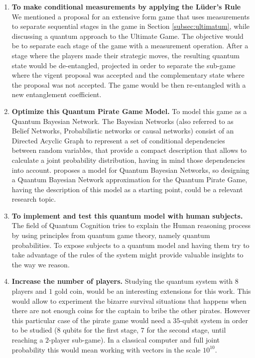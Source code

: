 \begin{enumerate}

\item \textbf{To make conditional measurements by applying the L\"{u}der's Rule} We mentioned a proposal for an extensive form game that uses measurements to separate sequential stages in the game in Section \ref{subsec:ultimatum}, while discussing a quantum approach to the Ultimate Game. The objective would be to separate each stage of the game with a measurement operation. After a stage where the players made their strategic moves, the resulting quantum state would be de-entangled, projected in order to separate  the sub-game where the vigent proposal was accepted and the complementary state where the proposal was not accepted. The game would be then re-entangled with a new entanglement coefficient. 

\item \textbf{Optimize this Quantum Pirate Game Model.} To model this game as a Quantum Bayesian Network. The Bayesian Networks (also referred to as Belief Networks, Probabilistic networks or causal networks) consist of an Directed Acyclic Graph to represent a set of conditional dependencies between random variables, that provide a compact description that allows to calculate a joint probability distribution, having in mind those dependencies into account. \cite{Tucci2012} proposes a model for Quantum Bayesian Networks, so designing a Quantum Bayesian Network approximation for the Quantum Pirate Game, having the description of this model as a starting point, could be a relevant research topic.

\item \textbf{To implement and test this quantum model with human subjects.} The field of Quantum Cognition tries to explain the Human reasoning process by using principles from quantum game theory, namely quantum probabilities. To expose subjects to a quantum model and having them try to take advantage of the rules of the system might provide valuable insights to the way we reason. 

\item \textbf{Increase the number of players.} Studying the quantum system with $8$ players and $1$ gold coin, would be an interesting extensions for this work. This would allow to experiment the bizarre survival situations that happens when there are not enough coins for the captain to bribe the other pirates. However this particular case of the pirate game would need a $35$-qubit system in order to be studied ($8$ qubits for the first stage, $7$ for the second stage, until reaching a $2$-player sub-game). In a classical computer and full joint probability this would mean working with vectors in the scale $10^{10}$.


\end{enumerate}
